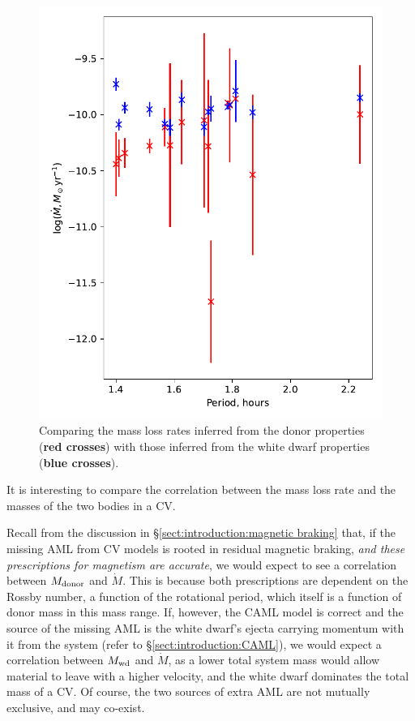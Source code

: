 \begin{figure}
    \centering
    \includegraphics[width=\textwidth]{figures/results/Mdot/compare_mdot_from_donor_vs_wd_vs_period.pdf}
    \caption{Comparing the mass loss rates inferred from the donor properties ({\bf red crosses}) with those inferred from the white dwarf properties ({\bf blue crosses}).}
    \label{fig:discussion:compare Mdot from donor and WD}
\end{figure}

It is interesting to compare the correlation between the mass loss rate and the masses of the two bodies in a CV.

Recall from the discussion in \S\ref{sect:introduction:magnetic braking} that, if the missing AML from CV models is rooted in residual magnetic braking, {\it and these prescriptions for magnetism are accurate}, we would expect to see a correlation between $M_{\rm donor}$ and $\dot M$.
This is because both prescriptions are dependent on the Rossby number, a function of the rotational period, which itself is a function of donor mass in this mass range.
If, however, the CAML model is correct and the source of the missing AML is the white dwarf's ejecta carrying momentum with it from the system (refer to \S\ref{sect:introduction:CAML}), we would expect a correlation between $M_{\rm wd}$ and $\dot M$, as a lower total system mass would allow material to leave with a higher velocity, and the white dwarf dominates the total mass of a CV.
Of course, the two sources of extra AML are not mutually exclusive, and may co-exist.

